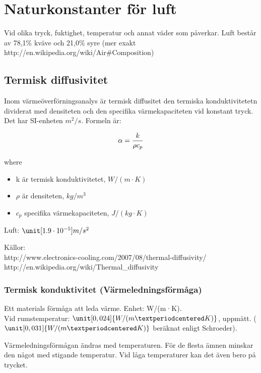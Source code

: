 \section{Naturkonstanter för luft}

Vid olika tryck, fuktighet, temperatur och annat väder som påverkar. Luft består av 78,1\% kväve och 21,0\% syre (mer exakt http://en.wikipedia.org/wiki/Air\#Composition)

\subsection{Termisk diffusivitet} %
Inom värmeöverförningsanalys är termisk diffusitet den termiska konduktivitetetn dividerat med densiteten och den specifika värmekapaciteten vid konstant tryck. Det har SI-enheten $m^2/s$. Formeln är:

\begin{equation}
\alpha = {k \over {\rho c_p}}
\end{equation}

where
\begin{itemize}
   \item[] k är termisk konduktivitetet, $\unit{W/(m·K)}$
   \item[] $\rho$ är densiteten, $\unit{kg/m^3}$
   \item[] $c_p$ specifika värmekapaciteten, $\unit{J/(kg·K)}$
\end{itemize}

Luft: $\unit[1.9\cdot10^{-5}]{m/s^2}$

Källor:\\
http://www.electronics-cooling.com/2007/08/thermal-diffusivity/\\
http://en.wikipedia.org/wiki/Thermal\_diffusivity\\


\subsubsection{Termisk konduktivitet (Värmeledningsförmåga)} %
Ett materials förmåga att leda värme. Enhet: W/(m·K).\\
Vid rumstemperatur: $\unit[0,024]{W/(m·K)}$, uppmätt. ($\unit[0,031]{W/(m·K)}$ beräknat enligt Schroeder).

Värmeledningsförmågan ändras med temperaturen. För de flesta ämnen minskar den något med stigande temperatur. Vid låga temperaturer kan det även bero på trycket.

